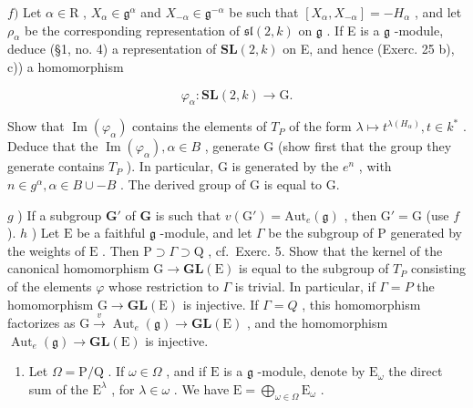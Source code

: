 \(f)\) Let \(\alpha \in \mathrm{R}\) , \(X_{\alpha} \in \mathfrak{g}^{\alpha}\) and \(X_{-\alpha} \in \mathfrak{g}^{-\alpha}\) be such that \([X_{\alpha}, X_{-\alpha}] = -H_{\alpha}\) , and let \(\rho_{\alpha}\) be the corresponding representation of \(\mathfrak{sl}(2, k)\) on \(\mathfrak{g}\) . If E is a \(\mathfrak{g}\) -module, deduce (§1, no. 4) a representation of \(\mathbf{SL}(2, k)\) on E, and hence (Exerc. 25 b), c)) a homomorphism

\[
\varphi_ {\alpha}: \mathbf {SL} (2, k) \to \mathrm{G}.
\]

Show that \(\operatorname{Im}(\varphi_{\alpha})\) contains the elements of \(T_{P}\) of the form \(\lambda \mapsto t^{\lambda(H_{\alpha})}, t \in k^{*}\) . Deduce that the \(\operatorname{Im}(\varphi_{\alpha}), \alpha \in B\) , generate G (show first that the group they generate contains \(T_{P}\) ). In particular, G is generated by the \(e^{n}\) , with \(n \in g^{\alpha}, \alpha \in B \cup -B\) . The derived group of G is equal to G.

\(g\) ) If a subgroup \(\mathbf{G}'\) of \(\mathbf{G}\) is such that \(v(\mathrm{G}') = \mathrm{Aut}_e(\mathfrak{g})\) , then \(\mathrm{G}' = \mathrm{G}\) (use \(f\) ). \(h\) ) Let \(\mathrm{E}\) be a faithful \(\mathfrak{g}\) -module, and let \(\Gamma\) be the subgroup of \(\mathrm{P}\) generated by the weights of \(\mathrm{E}\) . Then \(\mathrm{P} \supset \Gamma \supset \mathrm{Q}\) , cf.~Exerc. 5. Show that the kernel of the canonical homomorphism \(\mathrm{G} \to \mathbf{GL}(\mathrm{E})\) is equal to the subgroup of \(T_{P}\) consisting of the elements \(\varphi\) whose restriction to \(\varGamma\) is trivial. In particular, if \(\varGamma = P\) the homomorphism \(\mathrm{G} \to \mathbf{GL}(\mathrm{E})\) is injective. If \(\varGamma = Q\) , this homomorphism factorizes as \(\mathrm{G} \stackrel{v}{\longrightarrow} \operatorname{Aut}_{e}(\mathfrak{g}) \longrightarrow \mathbf{GL}(\mathrm{E})\) , and the homomorphism \(\operatorname{Aut}_{e}(\mathfrak{g}) \to \mathbf{GL}(\mathrm{E})\) is injective.

\begin{enumerate}
\def\labelenumi{\arabic{enumi})}
\setcounter{enumi}{26}
\tightlist
\item
  Let \(\Omega = \mathrm{P} / \mathrm{Q}\) . If \(\omega \in \Omega\) , and if \(\mathrm{E}\) is a \(\mathfrak{g}\) -module, denote by \(\mathrm{E}_{\omega}\) the direct sum of the \(\mathrm{E}^{\lambda}\) , for \(\lambda \in \omega\) . We have \(\mathrm{E} = \bigoplus_{\omega \in \Omega} \mathrm{E}_{\omega}\) .
\end{enumerate}

